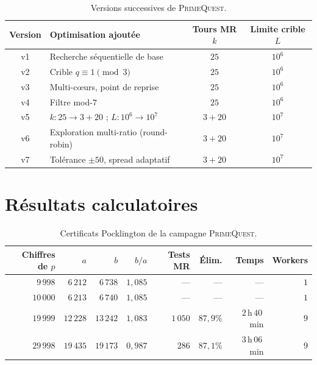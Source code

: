 \documentclass[11pt,a4paper]{article}
\theoremstyle{definition}
\theoremstyle{remark}
\begin{document}
\begin{table}[ht]\centering
\caption{Versions successives de \textsc{PrimeQuest}.}
\label{tab:versions}
\begin{tabular}{@{}clcc@{}}
\toprule
Version & Optimisation ajoutée & Tours MR $k$ & Limite crible $L$ \\
\midrule
v1 & Recherche séquentielle de base & $25$ & $10^6$ \\
v2 & Crible $q\equiv 1\pmod{3}$ & $25$ & $10^6$ \\
v3 & Multi-c\oe{}urs, point de reprise & $25$ & $10^6$ \\
v4 & Filtre mod-$7$ & $25$ & $10^6$ \\
v5 & $k\colon 25\to 3+20$ ; $L\colon 10^6\to 10^7$ & $3+20$ & $10^7$ \\
v6 & Exploration multi-ratio (round-robin) & $3+20$ & $10^7$ \\
v7 & Tolérance $\pm 50$, spread adaptatif & $3+20$ & $10^7$ \\
\bottomrule
\end{tabular}
\end{table}

\section{Résultats calculatoires}\label{sec:resultats}

\begin{table}[ht]\centering
\caption{Certificats Pocklington de la campagne \textsc{PrimeQuest}.}
\label{tab:resultats}
\begin{tabular}{@{}rrrrrrrr@{}}
\toprule
Chiffres de $p$ & $a$ & $b$ & $b/a$ & Tests MR & Élim. & Temps & Workers \\
\midrule
$9\,998$  & $6\,212$  & $6\,738$  & $1{,}085$ & ---      & ---      & ---             & $1$ \\
$10\,000$ & $6\,213$  & $6\,740$  & $1{,}085$ & ---      & ---      & ---             & $1$ \\
$19\,999$ & $12\,228$ & $13\,242$ & $1{,}083$ & $1\,050$ & $87{,}9\%$ & $2$\,h\,$40$\,min & $9$ \\
$29\,998$ & $19\,435$ & $19\,173$ & $0{,}987$ & $286$    & $87{,}1\%$ & $3$\,h\,$06$\,min & $9$ \\
\bottomrule
\end{tabular}
\end{table}
\end{document}
